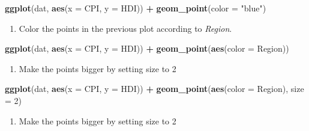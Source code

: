 \documentclass[]{book}
\newenvironment{Shaded}{\begin{snugshade}}{\end{snugshade}}
\newcommand{\KeywordTok}[1]{\textcolor[rgb]{0.13,0.29,0.53}{\textbf{#1}}}
\newcommand{\DataTypeTok}[1]{\textcolor[rgb]{0.13,0.29,0.53}{#1}}
\newcommand{\DecValTok}[1]{\textcolor[rgb]{0.00,0.00,0.81}{#1}}
\newcommand{\StringTok}[1]{\textcolor[rgb]{0.31,0.60,0.02}{#1}}
\newcommand{\OperatorTok}[1]{\textcolor[rgb]{0.81,0.36,0.00}{\textbf{#1}}}
\newcommand{\NormalTok}[1]{#1}
\providecommand{\tightlist}{%
  \setlength{\itemsep}{0pt}\setlength{\parskip}{0pt}}
\begin{document}
\begin{Shaded}
\begin{Highlighting}[]
\KeywordTok{ggplot}\NormalTok{(dat, }\KeywordTok{aes}\NormalTok{(}\DataTypeTok{x =}\NormalTok{ CPI, }\DataTypeTok{y =}\NormalTok{ HDI)) }\OperatorTok{+}
\StringTok{  }\KeywordTok{geom_point}\NormalTok{(}\DataTypeTok{color =} \StringTok{"blue"}\NormalTok{)}
\end{Highlighting}
\end{Shaded}

\begin{enumerate}
\def\labelenumi{\arabic{enumi}.}
\setcounter{enumi}{2}
\tightlist
\item
  Color the points in the previous plot according to \emph{Region}.
\end{enumerate}

\begin{Shaded}
\begin{Highlighting}[]
\KeywordTok{ggplot}\NormalTok{(dat, }\KeywordTok{aes}\NormalTok{(}\DataTypeTok{x =}\NormalTok{ CPI, }\DataTypeTok{y =}\NormalTok{ HDI)) }\OperatorTok{+}
\StringTok{  }\KeywordTok{geom_point}\NormalTok{(}\KeywordTok{aes}\NormalTok{(}\DataTypeTok{color =}\NormalTok{ Region))}
\end{Highlighting}
\end{Shaded}

\begin{enumerate}
\def\labelenumi{\arabic{enumi}.}
\setcounter{enumi}{3}
\tightlist
\item
  Make the points bigger by setting size to 2
\end{enumerate}

\begin{Shaded}
\begin{Highlighting}[]
\KeywordTok{ggplot}\NormalTok{(dat, }\KeywordTok{aes}\NormalTok{(}\DataTypeTok{x =}\NormalTok{ CPI, }\DataTypeTok{y =}\NormalTok{ HDI)) }\OperatorTok{+}
\StringTok{  }\KeywordTok{geom_point}\NormalTok{(}\KeywordTok{aes}\NormalTok{(}\DataTypeTok{color =}\NormalTok{ Region), }\DataTypeTok{size =} \DecValTok{2}\NormalTok{)}
\end{Highlighting}
\end{Shaded}

\begin{enumerate}
\def\labelenumi{\arabic{enumi}.}
\setcounter{enumi}{4}
\tightlist
\item
  Make the points bigger by setting size to 2
\end{enumerate}
\end{document}
